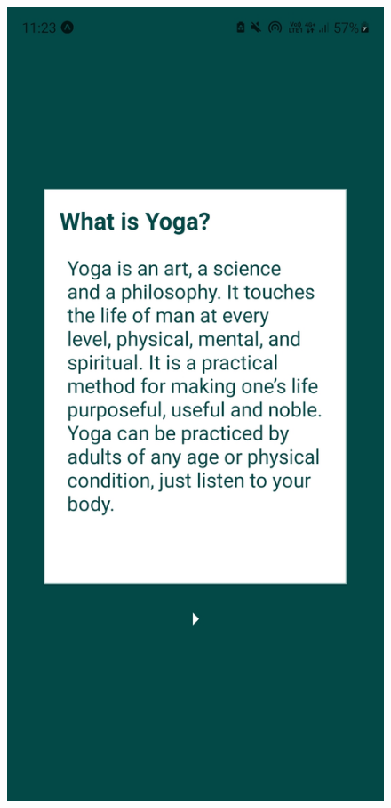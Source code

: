 \documentclass[a4paper, 12pt]{book}
\begin{document}
\begin{figure}[!tbp]
  \begin{minipage}[b]{0.35\textwidth}
    \includegraphics[width=\textwidth]{pozdrav1.jpg}\centering

\end{minipage}
\end{figure}
\end{document}
